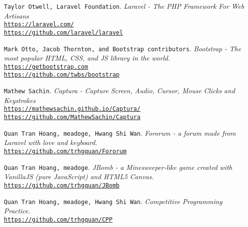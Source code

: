 \documentclass{article}
\begin{document}
    \begin{thebibliography}{5}
        \texttt{Taylor Otwell, Laravel Foundation}.
        \textit{Laravel - The PHP Framework For Web Artisans}\\
        \texttt{\url{https://laravel.com/}}\\
        \texttt{\url{https://github.com/laravel/laravel}}

        \texttt{Mark Otto, Jacob Thornton, and Bootstrap contributors}.
        \textit{Bootstrap - The most popular HTML, CSS, and JS library in the world.}\\
        \texttt{\href{https://getbootstrap.com}{https://getbootstrap.com}}\\
        \texttt{\href{https://github.com/twbs/bootstrap}{https://github.com/twbs/bootstrap}}

        \texttt{Mathew Sachin}.
        \textit{Captura - Capture Screen, Audio, Cursor, Mouse Clicks and Keystrokes}\\
        \texttt{\url{https://mathewsachin.github.io/Captura/}}\\
        \texttt{\url{https://github.com/MathewSachin/Captura}}

        \texttt{Quan Tran Hoang, meadoge, Hwang Shi Wan}.
        \textit{Fororum - a forum made from Laravel with love and keyboard.}\\
        \texttt{\url{https://github.com/trhgquan/Fororum}}

        \texttt{Quan Tran Hoang, meadoge}.
        \textit{JBomb - a Minesweeper-like game created with VanillaJS (pure JavaScript) and HTML5 Canvas.}\\
        \texttt{\url{https://github.com/trhgquan/JBomb}}

        \texttt{Quan Tran Hoang, meadoge, Hwang Shi Wan}.
        \textit{Competitive Programming Practice.}\\
        \texttt{\url{https://github.com/trhgquan/CPP}}
    \end{thebibliography}
\end{document}
